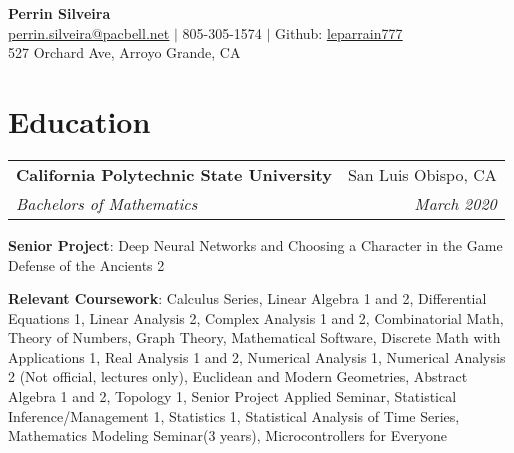 \documentclass[letterpaper,10pt]{article}
\makeatletter
\newcommand{\resumeItemNoBullet}[2]{
  \item[]\small{
    \hspace{-9pt}\textbf{#1}{: #2 \vspace{-6pt}}
  }
}
\newcommand{\resumeSubheading}[4]{
  \vspace{-1pt}\item[]
  \begin{tabular*}{0.98\textwidth}{l@{\extracolsep{\fill}}r}
      \hspace{-10pt}\textbf{#1} & #2 \\
      \hspace{-10pt}\textit{\small#3} & \textit{\small #4} \\
    \end{tabular*}\vspace{-5pt}
}
\newcommand{\resumeSubHeadingListStart}{\begin{itemize}[leftmargin=*]}
\newcommand{\resumeSubHeadingListEnd}{\end{itemize}}
\newcommand{\shorterSection}[1]{\vspace{-10pt}\section{#1}}
\makeatother
\begin{document}
\begin{center}
  \small \textbf{{\huge Perrin Silveira}} \\  \href{mailto:perrin.silveira@pacbell.net}{\color{blue}\underline{perrin.silveira@pacbell.net}} $\vert$
  805-305-1574 $\vert$
  Github: \href{https://github.com/leparrain777}{\color{blue}\underline{leparrain777}} \\
  \small 527 Orchard Ave, Arroyo Grande, CA
\end{center}

\shorterSection{Education}
  \resumeSubHeadingListStart
    \resumeSubheading
      {California Polytechnic State University}{San Luis Obispo, CA}
      {Bachelors of Mathematics}{March 2020}{
      \resumeItemNoBullet{Senior Project}{Deep Neural Networks and Choosing a Character in the Game Defense of the Ancients 2}
      \resumeItemNoBullet{Relevant Coursework}{Calculus Series, Linear Algebra 1 and 2, Differential Equations 1, Linear Analysis 2, Complex Analysis 1 and 2, Combinatorial Math, Theory of Numbers, Graph Theory, Mathematical Software, Discrete Math with Applications 1, Real Analysis 1 and 2, Numerical Analysis 1, Numerical Analysis 2 (Not official, lectures only), Euclidean and Modern Geometries, Abstract Algebra 1 and 2, Topology 1, Senior Project Applied Seminar, Statistical Inference/Management 1, Statistics 1, Statistical Analysis of Time Series, Mathematics Modeling Seminar(3 years), Microcontrollers for Everyone}
    }
  \resumeSubHeadingListEnd
\end{document}
